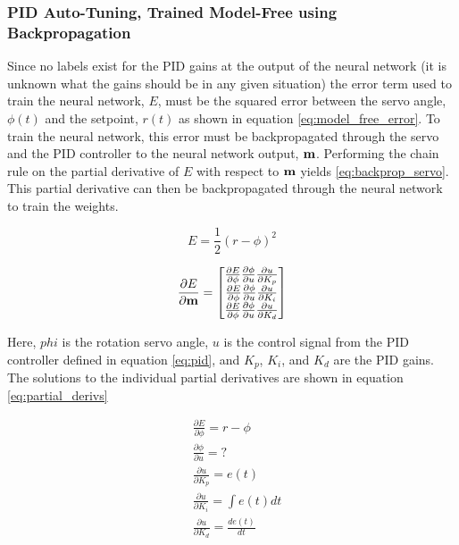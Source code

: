 \documentclass[letterpaper,12pt]{article}
\newcommand{\di}{\partial}
\begin{document}
\subsubsection{PID Auto-Tuning, Trained Model-Free using Backpropagation}\label{sec:model_free_backprop}
Since no labels exist for the PID gains at the output of the neural network (it is unknown what the gains should be in any given situation) the error term used to train the neural network, $E$, must be the squared error between the servo angle, $\phi(t)$ and the setpoint, $r(t)$ as shown in equation \ref{eq:model_free_error}. To train the neural network, this error must be backpropagated through the servo and the PID controller to the neural network output, $\bf{m}$. Performing the chain rule on the partial derivative of $E$ with respect to $\bf{m}$ yields \ref{eq:backprop_servo}. This partial derivative can then be backpropagated through the neural network to train the weights.

\begin{equation}
	\label{eq:model_free_error}
	E = \frac{1}{2}(r - \phi)^2
\end{equation}

\begin{equation}
	\label{eq:backprop_servo}
	\frac{\di E}{\di \bf{m}} =
	\begin{bmatrix}
		\frac{\di E}{\di \phi} \frac{\di \phi}{\di u} \frac{\di u}{\di K_p} \\
		\frac{\di E}{\di\phi} \frac{\di \phi}{\di u} \frac{\di u}{\di K_i} \\
		\frac{\di E}{\di \phi} \frac{\di \phi}{\di u} \frac{\di u}{\di K_d}
	\end{bmatrix}
\end{equation}

Here, $phi$ is the rotation servo angle, $u$ is the control signal from the PID controller defined in equation \ref{eq:pid}, and $K_p$, $K_i$, and $K_d$ are the PID gains. The solutions to the individual partial derivatives are shown in equation \ref{eq:partial_derivs}

\begin{equation}
\begin{split}
	\label{eq:partial_derivs}
	& \frac{\di E}{\di \phi} = r - \phi \\
	& \frac{\di \phi}{\di u} = ? \\
	& \frac{\di u}{\di K_p} = e(t) \\
	& \frac{\di u}{\di K_i} = \int e(t)dt \\
	& \frac{\di u}{\di K_d} = \frac{de(t)}{dt} \\
\end{split}
\end{equation}
\end{document}
